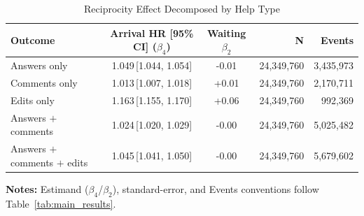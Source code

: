 \begin{table}[H]
\caption{Reciprocity Effect Decomposed by Help Type}
\label{tab:outcome_decomposition}
\centering
\footnotesize
\begin{tabular}{@{}lccrr@{}}
\toprule
\textbf{Outcome} & \textbf{Arrival HR [95\% CI] ($\beta_4$)} & \textbf{Waiting $\beta_2$} & \textbf{N} & \textbf{Events} \\
\midrule
Answers only & 1.049\,[1.044, 1.054] & -0.01 & 24,349,760 & 3,435,973 \\
Comments only & 1.013\,[1.007, 1.018] & +0.01 & 24,349,760 & 2,170,711 \\
Edits only & 1.163\,[1.155, 1.170] & +0.06 & 24,349,760 & 992,369 \\
Answers $+$ comments & 1.024\,[1.020, 1.029] & -0.00 & 24,349,760 & 5,025,482 \\
Answers $+$ comments $+$ edits & 1.045\,[1.041, 1.050] & -0.00 & 24,349,760 & 5,679,602 \\
\bottomrule
\end{tabular}
\vspace{0.35em}
\begin{minipage}{\linewidth}
\footnotesize
\raggedright
\textbf{Notes:} Estimand ($\beta_4$/$\beta_2$), standard-error, and Events conventions follow Table~\ref{tab:main_results}.
\end{minipage}
\end{table}